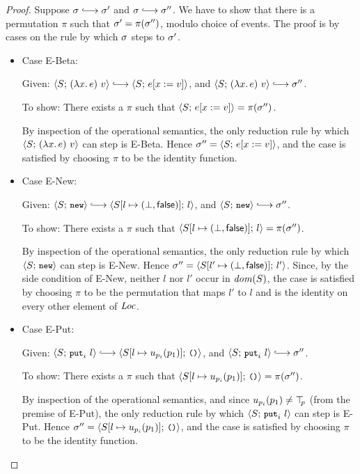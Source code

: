 \begin{proof}
  Suppose $\conf \parstepsto \conf'$ and $\conf \parstepsto \conf''$.
  We have to show that there is a permutation $\pi$ such that $\sigma'
  = \pi(\sigma'')$, modulo choice of events.  The proof is by cases on
  the rule by which $\sigma$ steps to $\sigma'$.

  \begin{itemize}

  \item Case {\sc E-Beta}:

    Given: $\config{S}{\app{(\lam{x}{e})}{v}} \parstepsto
    \config{S}{\subst{e}{x}{v}}$, and
    $\config{S}{\app{(\lam{x}{e})}{v}} \parstepsto \conf''$.

    To show: There exists a $\pi$ such that
    $\langle S;\, e[x := v] \rangle = \pi(\sigma'')$.

    By inspection of the operational semantics, the only reduction
    rule by which $\langle S;\, (\lambda x.\,e)~v \rangle$ can step is
    {\sc E-Beta}.  Hence $\sigma'' = \langle S;\, e[x := v] \rangle$,
    and the case is satisfied by choosing $\pi$ to be the identity
    function.

  \item Case {\sc E-New}:

    Given: $\config{S}{\NEW} \parstepsto
    \config{\extS{S}{l}{\bot}{\frozenfalse}}{l}$, and
    $\config{S}{\NEW} \parstepsto \conf''$.

    To show: There exists a $\pi$ such that
    $\langle S[l \mapsto (\bot, \textsf{false})];\, l \rangle = \pi(\sigma'')$.

    By inspection of the operational semantics, the only reduction
    rule by which $\langle S;\, \mbox{\small{\texttt{new}}} \rangle$ can step is {\sc E-New}.  Hence
    $\sigma'' = \langle S[l' \mapsto (\bot, \textsf{false})];\, l' \rangle$.  Since,
    by the side condition of {\sc E-New}, neither $l$ nor $l'$ occur
    in $\mathit{dom}(S)$, the case is satisfied by choosing $\pi$ to be the
    permutation that maps $l'$ to $l$ and is the identity on every
    other element of $\mathit{Loc}$.

  \item Case {\sc E-Put}:

    Given: $\config{S}{\putiexp{l}} \parstepsto
    \config{\extSRaw{S}{l}{u_{p_i}(p_1)}}{\unit}$, and
    $\config{S}{\putiexp{l}} \parstepsto \conf''$.

    To show: There exists a $\pi$ such that
    $\langle S[l \mapsto u_{p_i}(p_1)];\, \mbox{\small{\texttt{()}}} \rangle = \pi(\sigma'')$.

    By inspection of the operational semantics, and since
    $u_{p_i}(p_1) \neq \top\hspace{-0.85mm}_{p}$ (from the premise of {\sc E-Put}), the
    only reduction rule by which $\langle S;\, \mbox{\small{\texttt{put}}}_i~l \rangle$ can step is
    {\sc E-Put}.  Hence $\sigma'' =
    \langle S[l \mapsto u_{p_i}(p_1)];\, \mbox{\small{\texttt{()}}} \rangle$, and the case is
    satisfied by choosing $\pi$ to be the identity function.


\end{itemize}
\end{proof}
